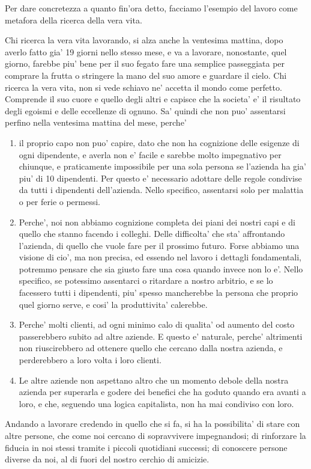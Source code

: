 Per dare concretezza a quanto fin'ora detto, facciamo l'esempio del lavoro come metafora della ricerca della vera vita.

Chi ricerca la vera vita lavorando, si alza anche la ventesima mattina, dopo averlo fatto gia' 19 giorni nello stesso mese, e va a lavorare, nonostante, quel giorno, farebbe piu' bene per il suo fegato fare una semplice passeggiata per comprare la frutta o stringere la mano del suo amore e guardare il cielo. Chi ricerca la vera vita, non si vede schiavo ne' accetta il mondo come perfetto. Comprende il suo cuore e quello degli altri e capisce che la societa' e' il risultato degli egoismi e delle eccellenze di ognuno. Sa' quindi che non puo' assentarsi perfino nella ventesima mattina del mese, perche'
\begin{enumerate}
    \item il proprio capo non puo' capire, dato che non ha cognizione delle esigenze di ogni dipendente, e averla non e' facile e sarebbe molto impegnativo per chiunque, e praticamente impossibile per una sola persona se l'azienda ha gia' piu' di 10 dipendenti.
        Per questo e' necessario adottare delle regole condivise da tutti i dipendenti dell'azienda. Nello specifico, assentarsi solo per malattia o per ferie o permessi.
    \item Perche', noi non abbiamo cognizione completa dei piani dei nostri capi e di quello che stanno facendo i colleghi. Delle difficolta' che sta' affrontando l'azienda, di quello che vuole fare per il prossimo futuro.
   Forse abbiamo una visione di cio', ma non precisa, ed essendo nel lavoro i dettagli fondamentali, potremmo pensare che sia giusto fare una cosa quando invece non lo e'. Nello specifico, se potessimo assentarci o ritardare a nostro arbitrio, e se lo facessero tutti i dipendenti, piu' spesso mancherebbe la persona che proprio quel giorno serve, e cosi' la produttivita' calerebbe.
    \item Perche' molti clienti, ad ogni minimo calo di qualita' od aumento del costo passerebbero subito ad altre aziende. E questo e' naturale, perche' altrimenti non riuscirebbero ad ottenere quello che cercano dalla nostra azienda, e perderebbero a loro volta i loro clienti.
    \item Le altre aziende non aspettano altro che un momento debole della nostra azienda per superarla e godere dei benefici che ha goduto quando era avanti a loro, e che, seguendo una logica capitalista, non ha mai condiviso con loro.

\end{enumerate}
Andando a lavorare credendo in quello che si fa, si ha la possibilita' di stare con altre persone, che come noi cercano di sopravvivere impegnandosi; di rinforzare la fiducia in noi stessi tramite i piccoli quotidiani successi; di conoscere persone diverse da noi, al di fuori del nostro cerchio di amicizie.

